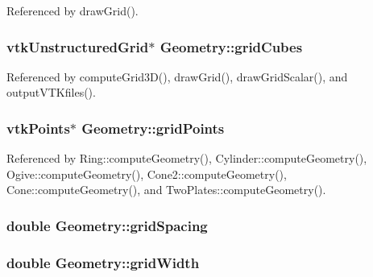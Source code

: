 Referenced by draw\-Grid().

\hypertarget{classGeometry_a3111987cb4c958ed83fd09a4cdc81ad0}{
\subsubsection[{grid\-Cubes}]{\setlength{\rightskip}{0pt plus 5cm}vtk\-Unstructured\-Grid$\ast$ Geometry\-::grid\-Cubes\hspace{0.3cm}{\ttfamily [protected]}}}\label{classGeometry_a3111987cb4c958ed83fd09a4cdc81ad0}


Referenced by compute\-Grid3\-D(), draw\-Grid(), draw\-Grid\-Scalar(), and output\-V\-T\-Kfiles().

\hypertarget{classGeometry_aed47a80e867e618e98272e830d297deb}{
\subsubsection[{grid\-Points}]{\setlength{\rightskip}{0pt plus 5cm}vtk\-Points$\ast$ Geometry\-::grid\-Points\hspace{0.3cm}{\ttfamily [protected]}}}\label{classGeometry_aed47a80e867e618e98272e830d297deb}


Referenced by Ring\-::compute\-Geometry(), Cylinder\-::compute\-Geometry(), Ogive\-::compute\-Geometry(), Cone2\-::compute\-Geometry(), Cone\-::compute\-Geometry(), and Two\-Plates\-::compute\-Geometry().

\hypertarget{classGeometry_aaddc1973a36683418ff6c00fb9a0e200}{
\subsubsection[{grid\-Spacing}]{\setlength{\rightskip}{0pt plus 5cm}double Geometry\-::grid\-Spacing\hspace{0.3cm}{\ttfamily [protected]}}}\label{classGeometry_aaddc1973a36683418ff6c00fb9a0e200}
\hypertarget{classGeometry_a047dd3be42ddff67aa9f8d494e7e8568}{
\subsubsection[{grid\-Width}]{\setlength{\rightskip}{0pt plus 5cm}double Geometry\-::grid\-Width\hspace{0.3cm}{\ttfamily [protected]}}}\label{classGeometry_a047dd3be42ddff67aa9f8d494e7e8568}


